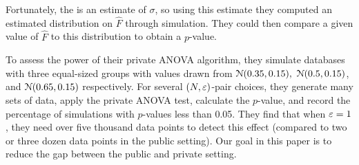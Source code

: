 Fortunately, the \sse is an estimate of $\sigma$, so using this estimate they computed an estimated distribution on $\widehat{F}$ through simulation. They could then compare a given value of $\widehat{F}$ to this distribution to obtain a $p$-value.


To assess the power of their private ANOVA algorithm, they simulate databases with three equal-sized groups with values drawn from $\mathcal{N}(0.35, 0.15),$ $ \mathcal{N}(0.5, 0.15)$, and $\mathcal{N}(0.65, 0.15)$ respectively. For several $(N,\varepsilon)$-pair choices, they generate many sets of data, apply the private ANOVA test, calculate the $p$-value, and record the percentage of simulations with $p$-values less than 0.05. They find that when $\varepsilon = 1$, they need over five thousand data points to detect this effect (compared to two or three dozen data points in the public setting).  Our goal in this paper is to reduce the gap between the public and private setting.


